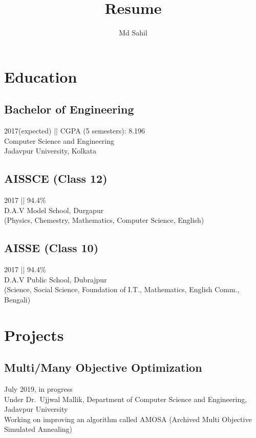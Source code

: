 \documentclass{article}
\title{Resume} \author{Md Sahil} \date{}
\begin{document}
{\maketitle} 
\section{Education} 

\subsection{Bachelor of Engineering}
2017(expected) || CGPA (5 semesters): 8.196\\
Computer Science and Engineering\\
Jadavpur University, Kolkata\\

\subsection{AISSCE (Class 12)}
2017 || 94.4\%\\
D.A.V Model School, Durgapur\\
(Physics, Chemestry, Mathematics, Computer Science, English)\\

\subsection{AISSE (Class 10)}
2017 || 94.4\%\\
D.A.V Public School, Dubrajpur\\
(Science, Social Science, Foundation of I.T., Mathematics, English Comm., Bengali)\\


\section{Projects} 

\subsection{Multi/Many Objective Optimization}
July 2019, in progress\\
Under Dr.\ Ujjwal Mallik, 
Department of Computer Science and Engineering, 
Jadavpur University\\

Working on improving an algorithm called AMOSA
(Archived Multi Objective Simulated Annealing)
\end{document}
